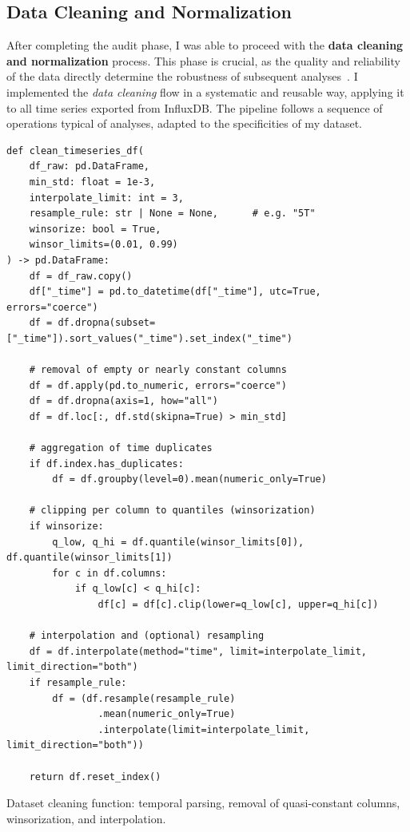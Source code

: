 \subsection{Data Cleaning and Normalization}
\label{subsec:data-cleaning}

After completing the audit phase, I was able to proceed with the \textbf{data cleaning and normalization} process.  
This phase is crucial, as the quality and reliability of the data directly determine the robustness of subsequent analyses~\cite{little2019statistical, aggarwal2015data}.  
I implemented the \emph{data cleaning} flow in a systematic and reusable way, applying it to all time series exported from InfluxDB.  
The pipeline follows a sequence of operations typical of analyses, adapted to the specificities of my dataset.

\begin{listing}[H]
\begin{verbatim}
def clean_timeseries_df(
    df_raw: pd.DataFrame,
    min_std: float = 1e-3,
    interpolate_limit: int = 3,
    resample_rule: str | None = None,      # e.g. "5T"
    winsorize: bool = True,
    winsor_limits=(0.01, 0.99)
) -> pd.DataFrame:
    df = df_raw.copy()
    df["_time"] = pd.to_datetime(df["_time"], utc=True, errors="coerce")
    df = df.dropna(subset=["_time"]).sort_values("_time").set_index("_time")

    # removal of empty or nearly constant columns
    df = df.apply(pd.to_numeric, errors="coerce")
    df = df.dropna(axis=1, how="all")
    df = df.loc[:, df.std(skipna=True) > min_std]

    # aggregation of time duplicates
    if df.index.has_duplicates:
        df = df.groupby(level=0).mean(numeric_only=True)

    # clipping per column to quantiles (winsorization)
    if winsorize:
        q_low, q_hi = df.quantile(winsor_limits[0]), df.quantile(winsor_limits[1])
        for c in df.columns:
            if q_low[c] < q_hi[c]:
                df[c] = df[c].clip(lower=q_low[c], upper=q_hi[c])

    # interpolation and (optional) resampling
    df = df.interpolate(method="time", limit=interpolate_limit, limit_direction="both")
    if resample_rule:
        df = (df.resample(resample_rule)
                .mean(numeric_only=True)
                .interpolate(limit=interpolate_limit, limit_direction="both"))

    return df.reset_index()
\end{verbatim}
\caption{Dataset cleaning function: temporal parsing, removal of quasi-constant columns, winsorization, and interpolation.}
\end{listing}

